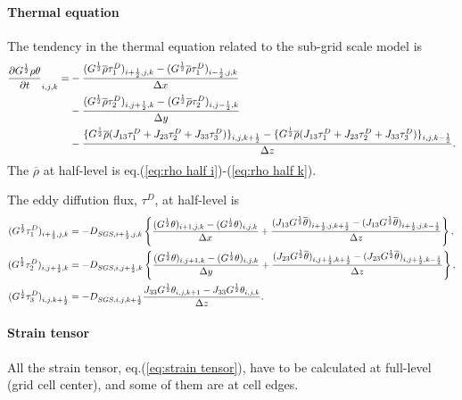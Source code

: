 \paragraph{Thermal equation}
The tendency in the thermal equation related to the sub-grid scale model is
\begin{align}
  \frac{\partial G^{\frac{1}{2}}\rho \theta}{\partial t}_{i,j,k} =
  &- \frac{(G^{\frac{1}{2}}\overline{\rho}\tau^D_1)_{i+\frac{1}{2},j,k}-(G^{\frac{1}{2}}\overline{\rho}\tau^D_1)_{i-\frac{1}{2},j,k}}{\Delta x} \nonumber \\
  &- \frac{(G^{\frac{1}{2}}\overline{\rho}\tau^D_2)_{i,j+\frac{1}{2},k}-(G^{\frac{1}{2}}\overline{\rho}\tau^D_2)_{i,j-\frac{1}{2},k}}{\Delta y} \nonumber \\
  &- \frac{\{G^{\frac{1}{2}}\overline{\rho}(J_{13}\tau^D_1+J_{23}\tau^D_2+J_{33}\tau^D_3)\}_{i,j,k+\frac{1}{2}}
          -\{G^{\frac{1}{2}}\overline{\rho}(J_{13}\tau^D_1+J_{23}\tau^D_2+J_{33}\tau^D_3)\}_{i,j,k-\frac{1}{2}}}{\Delta z}.
\end{align}
The $\overline{\rho}$ at half-level is eq.(\ref{eq:rho half i})-(\ref{eq:rho half k}).

The eddy diffution flux, $\tau^D$, at half-level
is
\begin{align}
  (G^{\frac{1}{2}}\tau^D_1)_{i+\frac{1}{2},j,k} &= -D_{SGS,i+\frac{1}{2},j,k} \left\{
  \frac{(G^{\frac{1}{2}}\theta)_{i+1,j,k}-(G^{\frac{1}{2}}\theta)_{i,j,k}}{\Delta x}
  + \frac{(J_{13}G^{\frac{1}{2}}\overline{\theta})_{i+\frac{1}{2},j,k+\frac{1}{2}}-(J_{13}G^{\frac{1}{2}}\overline{\theta})_{i+\frac{1}{2},j,k-\frac{1}{2}}}{\Delta z} \right\}, \\
  (G^{\frac{1}{2}}\tau^D_2)_{i,j+\frac{1}{2},k} &= -D_{SGS,i,j+\frac{1}{2},k} \left\{
  \frac{(G^{\frac{1}{2}}\theta)_{i,j+1,k}-(G^{\frac{1}{2}}\theta)_{i,j,k}}{\Delta y}
  + \frac{(J_{23}G^{\frac{1}{2}}\overline{\theta})_{i,j+\frac{1}{2},k+\frac{1}{2}}-(J_{23}G^{\frac{1}{2}}\overline{\theta})_{i,j+\frac{1}{2},k-\frac{1}{2}}}{\Delta z} \right\}, \\
  (G^{\frac{1}{2}}\tau^D_3)_{i,j,k+\frac{1}{2}} &= -D_{SGS,i,j,k+\frac{1}{2}} \frac{J_{33}G^{\frac{1}{2}}\theta_{i,j,k+1}-J_{33}G^{\frac{1}{2}}\theta_{i,j,k}}{\Delta z}.
\end{align}



\paragraph{Strain tensor}
All the strain tensor, eq.(\ref{eq:strain tensor}), have to be calculated
at full-level (grid cell center),
and some of them are at cell edges.

